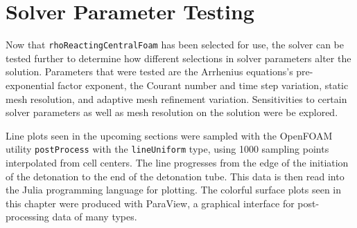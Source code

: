 \chapter{Solver Parameter Testing}
\label{solvtestchap}







Now that \verb|rhoReactingCentralFoam| has been selected for use, the solver can be tested further to determine how different selections in solver parameters alter the solution. Parameters that were tested are the Arrhenius equations's pre-exponential factor exponent, the Courant number and time step variation, static mesh resolution, and adaptive mesh refinement variation. Sensitivities to certain solver parameters as well as mesh resolution on the solution were be explored. 


Line plots seen in the upcoming sections were sampled with the OpenFOAM utility \verb|postProcess| with the \verb|lineUniform| type, using 1000 sampling points interpolated from cell centers. The line progresses from the edge of the initiation of the detonation to the end of the detonation tube. This data is then read into the Julia programming language for plotting. The colorful surface plots seen in this chapter were produced with ParaView\cite{paraview}, a graphical interface for post-processing data of many types. 

